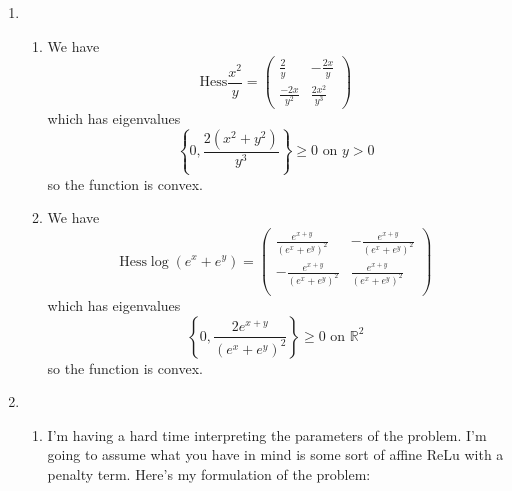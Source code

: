 \documentclass[12pt]{article}
\begin{document}
\begin{enumerate}
\begin{enumerate}
\begin{proof}
            Recall that $f\in C^2(\Omega)$ is convex in $\Omega$ iff $\text{Hess}f\geq 0$. Further, recall that a convex set is bounded by a convex curve. Then, we only need to prove that the boundary of $C$ is not a convex curve by showing $\text{Hess}f<0$.
            $$
            \text{Hess}f = 
            \begin{pmatrix}
                2 & 5 \\
                 5& 4 
                \end{pmatrix}
            $$
            has eigenvalues $\{4 + \sqrt{34}, 4 - \sqrt{34}\}$, the latter of which is negative.
        \end{proof}
        \item The set $D:=\{x\in\mathbb R^d| \sum_ix_i^2=1 \}$ is not convex.
        \begin{proof}
            This is $S^{d-1}\hookrightarrow\mathbb R^{d}$. The sphere is obviously not convex in $\mathbb R^d$. By counterexample (or triangle inequality in general), 
            \begin{align*}
                xt+(1-t)y\big\vert_{t=1/2}=\frac{x+y}{2}
            \end{align*}
            which has norm $\sqrt{2}/2$ and hence is outside $D$.

        \end{proof}
    \end{enumerate}
    \item \begin{enumerate}
        \item We have
        $$\text{Hess}\frac{x^2}{y} =  \begin{pmatrix}
            \frac{2}{y} & -\frac{2x}{y} \\
             \frac{-2x}{y^2}& \frac{2 x^2}{y^3} 
            \end{pmatrix}$$
            which has eigenvalues
            $$
            \left\{0,\frac{2(x^2+y^2)}{y^3} \right\}\geq 0\text{ on }y>0 
            $$
            so the function is convex. 
        \item We have
        $$
        \text{Hess}\log\left(e^{x}+e^{y}\right) =  
\begin{pmatrix}
         \frac{e^{x+y}}{\left(e^x+e^y\right)^2} & -\frac{e^{x+y}}{\left(e^x+e^y\right)^2} \\
         -\frac{e^{x+y}}{\left(e^x+e^y\right)^2} & \frac{e^{x+y}}{\left(e^x+e^y\right)^2} \\
\end{pmatrix}
        $$
        which has eigenvalues
            $$
            \left\{0,\frac{2 e^{x+y}}{\left(e^x+e^y\right)^2} \right\}\geq 0\text{ on }\mathbb R^2
            $$
            so the function is convex.
    \end{enumerate}
    \item \begin{enumerate}
        \item I'm having a hard time interpreting the parameters of the problem. I'm going to assume what you have in mind is some sort of affine ReLu with a penalty term. Here's my formulation of the problem:
        

\end{enumerate}
\end{enumerate}
\end{document}
